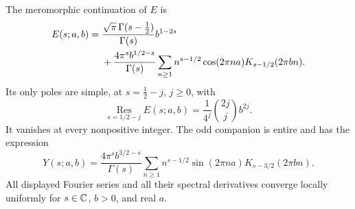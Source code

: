\begin{proposition}
\label{qspec:prop:poisson}
The meromorphic continuation of $E$ is
\begin{align}
E(s;a,b)={}&\frac{\sqrt\pi\,\Gamma(s-\tfrac12)}{\Gamma(s)}b^{1-2s}\notag\\
&+\frac{4\pi^s b^{1/2-s}}{\Gamma(s)}
\sum_{n\ge1}n^{s-1/2}\cos(2\pi na)K_{s-1/2}(2\pi bn).
\label{qspec:eq:poisson}
\end{align}
Its only poles are simple, at $s=\tfrac12-j$, $j\ge0$, with
\begin{equation}\label{qspec:eq:residues}
\operatorname*{Res}_{s=1/2-j} E(s;a,b)
=\frac1{4^j}\binom{2j}{j}b^{2j}.
\end{equation}
It vanishes at every nonpositive integer. The odd companion is entire and
has the expression
\begin{equation}\label{qspec:eq:odd-poisson}
Y(s;a,b)=\frac{4\pi^s b^{3/2-s}}{\Gamma(s)}
\sum_{n\ge1}n^{s-1/2}\sin(2\pi na)K_{s-3/2}(2\pi bn).
\end{equation}
All displayed Fourier series and all their spectral derivatives converge
locally uniformly for $s\in\mathbb C$, $b>0$, and real $a$.
\end{proposition}
